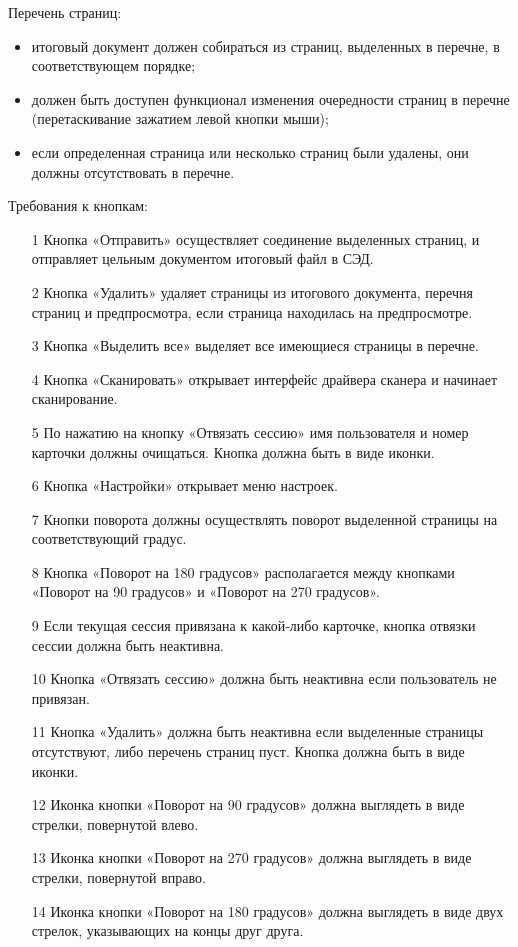 Перечень страниц: 
\begin{itemize}
	\item итоговый документ должен собираться из страниц, выделенных в перечне, в соответствующем порядке;
	\item должен быть доступен функционал изменения очередности страниц в перечне (перетаскивание зажатием левой кнопки мыши); 
	\item если определенная страница или несколько страниц были удалены, они должны отсутствовать в перечне.
\end{itemize}

Требования к кнопкам:
\begin{enumerate}
	\item[1] Кнопка «Отправить» осуществляет соединение выделенных страниц, и отправляет цельным документом итоговый файл в СЭД.
	\item[2] Кнопка «Удалить» удаляет страницы из итогового документа, перечня страниц и предпросмотра, если страница находилась на предпросмотре.
	\item[3] Кнопка «Выделить все» выделяет все имеющиеся страницы в перечне.
	\item[4] Кнопка «Сканировать» открывает интерфейс драйвера сканера и начинает сканирование.
	\item[5] По нажатию на кнопку «Отвязать сессию» имя пользователя и номер карточки должны очищаться. Кнопка должна быть в виде иконки.
	\item[6] Кнопка «Настройки» открывает меню настроек.
	\item[7] Кнопки поворота должны осуществлять поворот выделенной страницы на соответствующий градус.
	\item[8] Кнопка «Поворот на 180 градусов» располагается между кнопками «Поворот на 90 градусов» и «Поворот на 270 градусов».
	\item[9] Если текущая сессия привязана к какой-либо карточке, кнопка отвязки сессии должна быть неактивна.
	\item[10] Кнопка «Отвязать сессию» должна быть неактивна если пользователь не привязан.
	\item[11] Кнопка «Удалить» должна быть неактивна если выделенные страницы отсутствуют, либо перечень страниц пуст. Кнопка должна быть в виде иконки.
	\item[12] Иконка кнопки «Поворот на 90 градусов» должна выглядеть в виде стрелки, повернутой влево.
	\item[13] Иконка кнопки «Поворот на 270 градусов» должна выглядеть в виде стрелки, повернутой вправо.
	\item[14] Иконка кнопки «Поворот на 180 градусов» должна выглядеть в виде двух стрелок, указывающих на концы друг друга.
\end{enumerate}


